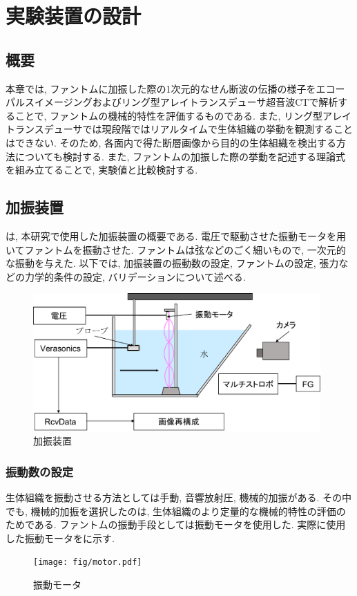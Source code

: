 \chapter{実験装置の設計\label{devicesection}}
\newpage
\section{概要}
本章では, ファントムに加振した際の1次元的なせん断波の伝播の様子をエコーパルスイメージングおよびリング型アレイトランスデューサ超音波CTで解析することで, ファントムの機械的特性を評価するものである. また, リング型アレイトランスデューサでは現段階ではリアルタイムで生体組織の挙動を観測することはできない. そのため, 各面内で得た断層画像から目的の生体組織を検出する方法についても検討する. また, ファントムの加振した際の挙動を記述する理論式を組み立てることで, 実験値と比較検討する.
\section{加振装置}
は, 本研究で使用した加振装置の概要である. 電圧で駆動させた振動モータを用いてファントムを振動させた. ファントムは弦などのごく細いもので, 一次元的な振動を与えた. 以下では, 加振装置の振動数の設定, ファントムの設定, 張力などの力学的条件の設定, バリデーションについて述べる. 
\begin{figure}[H]
  \begin{center}
    \includegraphics[width=110mm]{fig/jikkendevice.pdf}
  \end{center}
  \caption{加振装置}
\end{figure}
\subsection{振動数の設定}
生体組織を振動させる方法としては手動, 音響放射圧, 機械的加振がある. その中でも, 機械的加振を選択したのは, 生体組織のより定量的な機械的特性の評価のためである. ファントムの振動手段としては振動モータを使用した. 実際に使用した振動モータをに示す.
\begin{figure}[H]
  \begin{center}
    \texttt{[image: fig/motor.pdf]}
  \end{center}
  \caption{振動モータ}
\end{figure}
